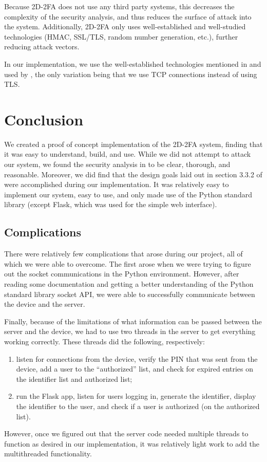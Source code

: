 \documentclass[11pt]{article}
\begin{document}
Because 2D-2FA does not use any third party systems, this decreases the
complexity of the security analysis, and thus reduces the surface of
attack into the system. Additionally, 2D-2FA only uses well-established
and well-studied technologies (HMAC, SSL/TLS, random number generation,
etc.), further reducing attack vectors.

In our implementation, we use the well-established technologies
mentioned in and used by \cite{shirvanian2d2fa}, the only variation
being that we use TCP connections instead of using TLS.

\section{Conclusion}

We created a proof of concept implementation of the 2D-2FA system,
finding that it was easy to understand, build, and use. While we did not
attempt to attack our system, we found the security analysis in
\cite{shirvanian2d2fa} to be clear, thorough, and reasonable. Moreover,
we did find that the design goals laid out in section 3.3.2 of
\cite{shirvanian2d2fa} were accomplished during our implementation. It
was relatively easy to implement our system, easy to use, and only made
use of the Python standard library (except Flask, which was used for the
simple web interface). 

\subsection{Complications}

There were relatively few complications that arose during our project,
all of which we were able to overcome. The first arose when we were
trying to figure out the socket communications in the Python
environment. However, after reading some documentation and getting a
better understanding of the Python standard library socket API, we were
able to successfully communicate between the device and the server. 

Finally, because of the limitations of what information can be passed
between the server and the device, we had to use two threads in the
server to get everything working correctly. These threads did the
following, respectively: 
\begin{enumerate}
    \item listen for connections from the device, verify the PIN that
    was sent from the device, add a user to the ``authorized'' list, and
    check for expired entries on the identifier list and authorized
    list;
    \item run the Flask app, listen for users logging in, generate the
    identifier, display the identifier to the user, and check if a user
    is authorized (on the authorized list). 
\end{enumerate}
However, once we figured out that the server code needed multiple threads to
function as desired in our implementation, it was relatively light work
to add the multithreaded functionality. 
\end{document}
